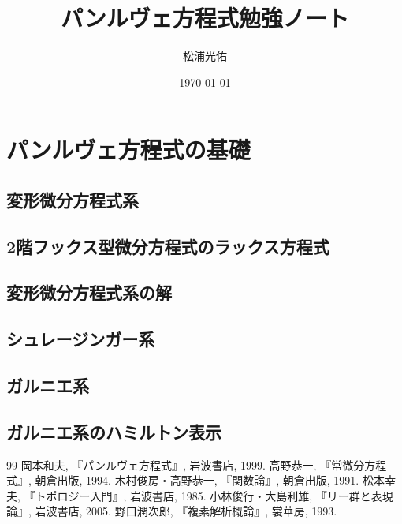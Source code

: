 \documentclass[paper=a4, fontsize=11pt]{jlreq} %
\title{パンルヴェ方程式勉強ノート}
\author{松浦光佑}
\date{\today}
\theoremstyle{break}
\theoremstyle{qa}
\begin{document}
\maketitle
\tableofcontents %



\section{パンルヴェ方程式の基礎}
\subsection{変形微分方程式系}

\subsection{2階フックス型微分方程式のラックス方程式}

\subsection{変形微分方程式系の解}

\subsection{シュレージンガー系}

\subsection{ガルニエ系}

\subsection{ガルニエ系のハミルトン表示}

\appendix


\begin{thebibliography}{99}
     岡本和夫, 『パンルヴェ方程式』, 岩波書店, 1999.
     高野恭一, 『常微分方程式』, 朝倉出版, 1994.
     木村俊房・高野恭一, 『関数論』, 朝倉出版, 1991.
     松本幸夫, 『トポロジー入門』, 岩波書店, 1985.
     小林俊行・大島利雄, 『リー群と表現論』, 岩波書店, 2005.
     野口潤次郎, 『複素解析概論』, 裳華房, 1993.
\end{thebibliography}
\end{document}
